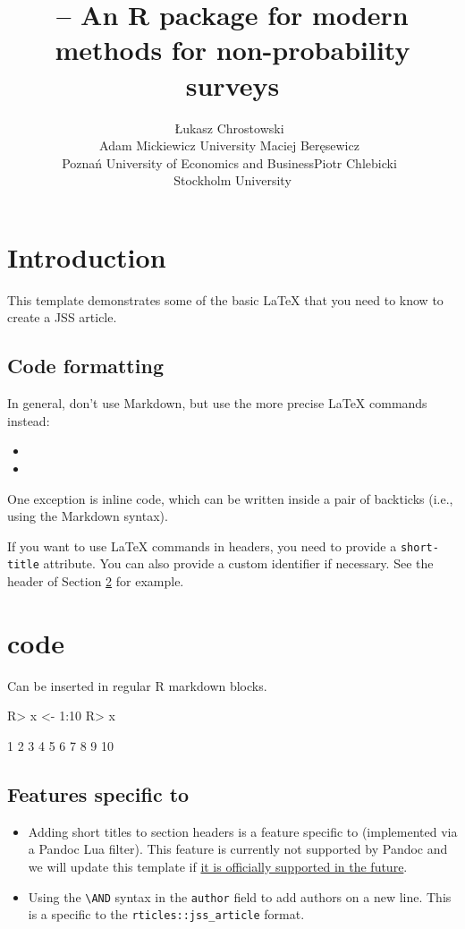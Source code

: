 \documentclass[
]{jss}
\author{
Łukasz Chrostowski~\orcidlink{0000-0000-0000-0000}\\Adam Mickiewicz
University \And Maciej
Beręsewicz~\orcidlink{0000-0002-8281-4301}\\Poznań University of
Economics and Business\AND Piotr
Chlebicki~\orcidlink{0000-0000-0000-0000}\\Stockholm University
}
\title{\pkg{nonprobsvy} -- An R package for modern methods for
non-probability surveys}
\providecommand{\tightlist}{%
  \setlength{\itemsep}{0pt}\setlength{\parskip}{0pt}}
\begin{document}
\section{Introduction}\label{introduction}

This template demonstrates some of the basic LaTeX that you need to know
to create a JSS article.

\subsection{Code formatting}\label{code-formatting}

In general, don't use Markdown, but use the more precise LaTeX commands
instead:

\begin{itemize}
\item
\item
\end{itemize}

One exception is inline code, which can be written inside a pair of
backticks (i.e., using the Markdown syntax).

If you want to use LaTeX commands in headers, you need to provide a
\texttt{short-title} attribute. You can also provide a custom identifier
if necessary. See the header of Section \ref{r-code} for example.

\section[R code]{ code}\label{r-code}

Can be inserted in regular R markdown blocks.

\begin{CodeChunk}
\begin{CodeInput}
R> x <- 1:10
R> x
\end{CodeInput}
\begin{CodeOutput}
 [1]  1  2  3  4  5  6  7  8  9 10
\end{CodeOutput}
\end{CodeChunk}

\subsection[Features specific to rticles]{Features specific to
}\label{features-specific-to}

\begin{itemize}
\tightlist
\item
  Adding short titles to section headers is a feature specific to
   (implemented via a Pandoc Lua filter). This feature is
  currently not supported by Pandoc and we will update this template if
  \href{https://github.com/jgm/pandoc/issues/4409}{it is officially
  supported in the future}.
\item
  Using the \texttt{\textbackslash{}AND} syntax in the \texttt{author}
  field to add authors on a new line. This is a specific to the
  \texttt{rticles::jss\_article} format.
\end{itemize}
\end{document}
